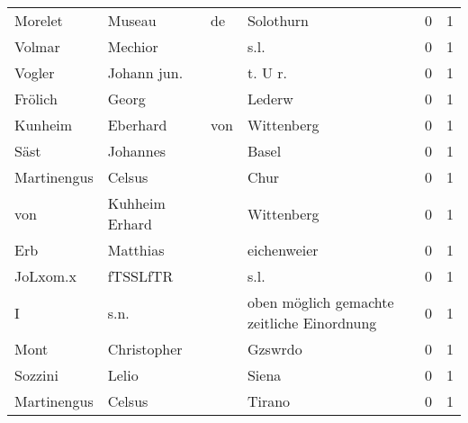 \documentclass[10pt,a4paper,landscape]{article}
\begin{document}
\begin{longtable}{llllrr}
                  Morelet &                             Museau &          de &                                   Solothurn &          0 &         1 \\
                   Volmar &                            Mechior &             &                                        s.l. &          0 &         1 \\
                   Vogler &                        Johann jun. &             &                                    t. U r.  &          0 &         1 \\
                  Frölich &                              Georg &             &                                      Lederw &          0 &         1 \\
                  Kunheim &                           Eberhard &         von &                                  Wittenberg &          0 &         1 \\
                     Säst &                           Johannes &             &                                       Basel &          0 &         1 \\
              Martinengus &                             Celsus &             &                                        Chur &          0 &         1 \\
                      von &                     Kuhheim Erhard &             &                                  Wittenberg &          0 &         1 \\
                      Erb &                           Matthias &             &                                 eichenweier &          0 &         1 \\
                 JoLxom.x &                           fTSSLfTR &             &                                        s.l. &          0 &         1 \\
                        I &                               s.n. &             &  oben möglich gemachte zeitliche Einordnung &          0 &         1 \\
                     Mont &                        Christopher &             &                                     Gzswrdo &          0 &         1 \\
                  Sozzini &                              Lelio &             &                                       Siena &          0 &         1 \\
              Martinengus &                             Celsus &             &                                      Tirano &          0 &         1 \\

\end{longtable}
\end{document}
